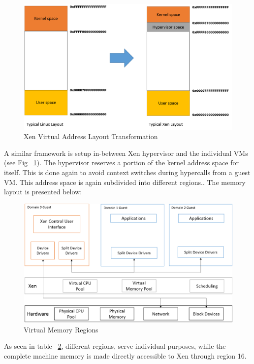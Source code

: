 \begin{figure}
\centering
\includegraphics[scale=0.6]{figures/VA_layout_hypervisor.png}
\caption{Xen Virtual Address Layout Transformation}
\label{fig:xen_layout}
\end{figure}


A similar framework is setup in-between Xen hypervisor and the individual VMs (see Fig ~\ref{fig:xen_layout}). The hypervisor reserves a portion of the kernel address space for itself. This is done again to avoid context switches during hypercalls from a guest VM. This address space is again subdivided into different regions.. The memory layout is presented below: 



\begin{figure}
\centering
\includegraphics[scale=0.6]{figures/Xen_model.png}
\caption{Virtual Memory Regions}
\label{tab:xen_address}
\end{figure}

As seen in table ~\ref{tab:xen_address}, different regions, serve individual purposes, while the complete machine memory is made directly accessible to Xen through region 16. 


